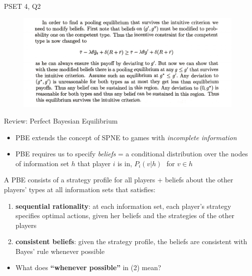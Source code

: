 \documentclass[10pt]{beamer}
\begin{document}
\begin{frame}{PSET 4, Q2}

\begin{figure}
\includegraphics[width=\textwidth]{q23.png}
\end{figure}


\end{frame}



\begin{frame}{Review: Perfect Bayesian Equilibrium}

\begin{itemize}
\item PBE extends the concept of SPNE to games with \textit{incomplete information} \pause 
\item PBE requires us to specify \textit{beliefs} = a conditional distribution over the nodes of information set $h$ that player $i$ is in, $P_i(v | h) \, \, $ for $ v \in h$
\end{itemize}
 
\pause

\begin{tcolorbox}
A PBE consists of a strategy profile for all players + beliefs about the other players' types at all information sets that satisfies:

\begin{enumerate}
\item \textbf{sequential rationality}: at each information set, each
player's strategy specifies optimal actions, given her beliefs and the strategies of the other players 
\item \textbf{consistent beliefs}: given the strategy profile, the beliefs are consistent with Bayes’ rule whenever possible
\end{enumerate}
\end{tcolorbox}

\pause 
\begin{itemize}
\item What does \textbf{``whenever possible''}  in (2) mean?
\end{itemize}

\end{frame}
\end{document}
